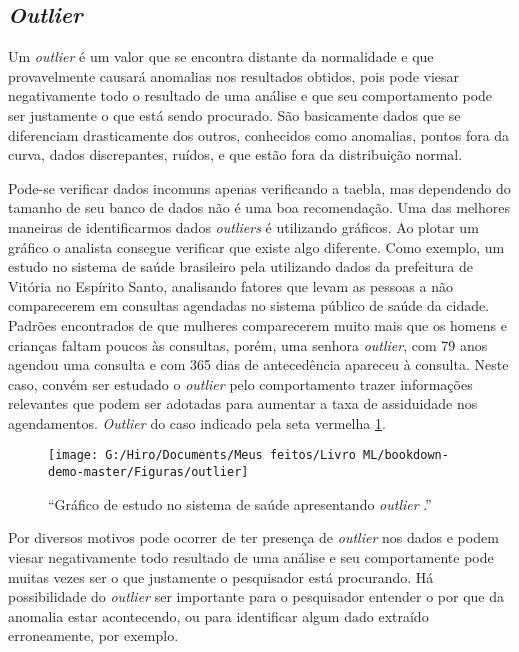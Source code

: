 \documentclass[
  openany]{book}
\begin{document}
\hypertarget{outlier}{%
\subsection{\texorpdfstring{\emph{Outlier}}{Outlier}}\label{outlier}}

Um \emph{outlier} é um valor que se encontra distante da normalidade e que provavelmente causará anomalias nos resultados obtidos, pois pode viesar negativamente todo o resultado de uma análise e que seu comportamento pode ser justamente o que está sendo procurado. São basicamente dados que se diferenciam drasticamente dos outros, conhecidos como anomalias, pontos fora da curva, dados discrepantes, ruídos, e que estão fora da distribuição normal.

Pode-se verificar dados incomuns apenas verificando a taebla, mas dependendo do tamanho de seu banco de dados não é uma boa recomendação. Uma das melhores maneiras de identificarmos dados \emph{outliers} é utilizando gráficos. Ao plotar um gráfico o analista consegue verificar que existe algo diferente. Como exemplo, um estudo no sistema de saúde brasileiro pela \citet{aquarela} utilizando dados da prefeitura de Vitória no Espírito Santo, analisando fatores que levam as pessoas a não comparecerem em consultas agendadas no sistema público de saúde da cidade. Padrões encontrados de que mulheres comparecerem muito mais que os homens e crianças faltam poucos às consultas, porém, uma senhora \emph{outlier}, com 79 anos agendou uma consulta e com 365 dias de antecedência apareceu à consulta. Neste caso, convém ser estudado o \emph{outlier} pelo comportamento trazer informações relevantes que podem ser adotadas para aumentar a taxa de assiduidade nos agendamentos. \emph{Outlier} do caso indicado pela seta vermelha \ref{fig:outlier}.

\begin{figure}

{\centering \texttt{[image: G:/Hiro/Documents/Meus feitos/Livro ML/bookdown-demo-master/Figuras/outlier]} 

}

\caption{``Gráfico de estudo no sistema de saúde apresentando \emph{outlier} \citep{aquarela}.''}\label{fig:outlier}
\end{figure}



Por diversos motivos pode ocorrer de ter presença de \emph{outlier} nos dados e podem viesar negativamente todo resultado de uma análise e seu comportamente pode muitas vezes ser o que justamente o pesquisador está procurando. Há possibilidade do \emph{outlier} ser importante para o pesquisador entender o por que da anomalia estar acontecendo, ou para identificar algum dado extraído erroneamente, por exemplo.
\end{document}

